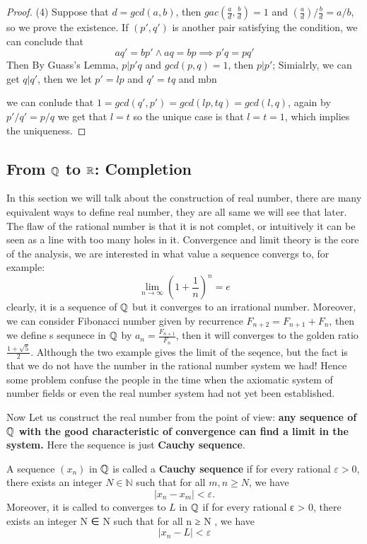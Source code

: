 \documentclass[en,geye,blue,pc,12pt]{elegantnote}
\begin{document}
\begin{proposition}
\begin{proof}
    (4) Suppose that \(d = gcd(a,b)\), then \(gac(\frac{a}{d},\frac{b}{d}) =1\) and \((\frac{a}{d})/\frac{b}{d} = a/b\), so we prove the existence. If \((p',q')\) is another pair satisfying the condition, we can conclude that 
    \[aq' = bp' \land aq =bp \implies p'q = pq'\]
    Then By Guass's Lemma, \(p|p'q\) and \(gcd(p,q)=1\), then \(p|p'\); Simialrly, we can get \(q|q'\), then we let \(p' = lp\) and \(q' =tq\) and mbn 
    
    
    we can conlude that \(1 = gcd(q',p') = gcd(lp,tq) = gcd(l,q)\), again by \(p'/q' = p/q\) we get that \(l=t\) so the unique case is that \(l=t=1\), which implies the uniqueness.
    \end{proof}
\end{proposition}

\subsection{From \texorpdfstring{$\mathbb{Q}$}{TEXT} to \texorpdfstring{$\mathbb{R}$}{TEXT}: Completion}
In this section we will talk about the construction of real number, there are many equivalent ways to define real number, they are all same we will see that later. The flaw of the rational number is that it is not complet, or intuitively it can be seen as a line with too many holes in it. Convergence and limit theory is the core of the analysis, we are interested in what value a sequence convergs to, for example:
\[\lim_{n \rightarrow \infty} (1+\frac{1}{n})^n =e\]
clearly, it is a sequence of \(\mathbb{Q}\) but it converges to an irrational number. Moreover, we can consider Fibonacci number given by recurrence \(F_{n+2} = F_{n+1} + F_{n}\), then we define s sequnece in \(\mathbb{Q}\) by \(a_n = \frac{F_{n+1}}{F_n}\), then it will converges to the golden ratio \(\frac{1+\sqrt{5}}{2}\).
Although the two example gives the limit of the seqence, but the fact is that we do not have the number in the rational number system we had! Hence some problem confuse the people in the time when the axiomatic system of number fields or even the real number system had not yet been established. 

Now Let us construct the real number from the point of view: \textbf{any sequence of \(\mathbb{Q}\) with the good characteristic of convergence can find a limit in the system.} Here the sequence is just \textbf{Cauchy sequence}.
\begin{definition}
  A sequence \((x_n)\) in \(\mathbb{\mathbb{Q}}\) is called a \textbf{Cauchy sequence} if for every rational \(\varepsilon > 0\), there exists an integer \(N \in \mathbb{N}\) such that for all \(m, n \geq N\), we have
\[
|x_n - x_m| < \varepsilon.
\]
Moreover, it is called to converges to \(L\) in \(\mathbb{Q}\) if for every rational
ε > 0, there exists an integer N ∈ N such that for all  n ≥ N , we have
\[|x_n-L| < \varepsilon\]
\end{definition}
\end{document}
